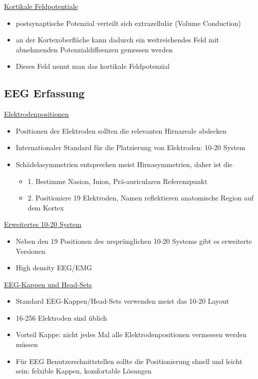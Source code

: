 \documentclass[a4paper,10pt,oneside]{article}
\begin{document}
\underline{Kortikale Feldpotentiale} \\
	\begin{itemize}
		\item postsynaptische Potenzial verteilt sich extrazellulär (Volume Conduction)
		\item an der Kortexoberfläche kann dadurch ein weitreichendes Feld mit abnehmenden Potenzialdiffeenzen gemessen werden
		\item Dieses Feld nennt man das kortikale Feldpotenzial
	\end{itemize}
	
\subsection{EEG Erfassung}
\underline{Elektrodenpositionen} \\
	\begin{itemize}
		\item Positionen der Elektroden sollten die relevanten Hirnareale abdecken
		\item Internationaler Standard für die Platzierung von Elektroden: 10-20 System
		\item Schädelasymmetrien entsprechen meist Hirnasymmetrien, daher ist die 
			\begin{itemize}
				\item 1. Bestimme Nasion, Inion, Prä-auricularen Referenzpunkt
				\item 2. Positioniere 19 Elektroden, Namen reflektieren anatomische Region auf dem Kortex 
			\end{itemize}
	\end{itemize}
	
\underline{Erweitertes 10-20 System} \\
	\begin{itemize}
		\item Neben den 19 Positionen des ursprünglichen 10-20 Systems gibt es erweiterte Versionen
		\item High density EEG/EMG
	\end{itemize}
	
\underline{EEG-Kappen und Head-Sets} \\
	\begin{itemize}
		\item Standard EEG-Kappen/Head-Sets verwenden meist das 10-20 Layout
		\item 16-256 Elektroden sind üblich
		\item Vorteil Kappe: nicht jedes Mal alle Elektrodenpositionen vermessen werden müssen
		\item Für EEG Benutzerschnittstellen sollte die Positionierung shnell und leicht sein: felxible Kappen, komfortable Lösungen
	\end{itemize}
 		
\end{document}
